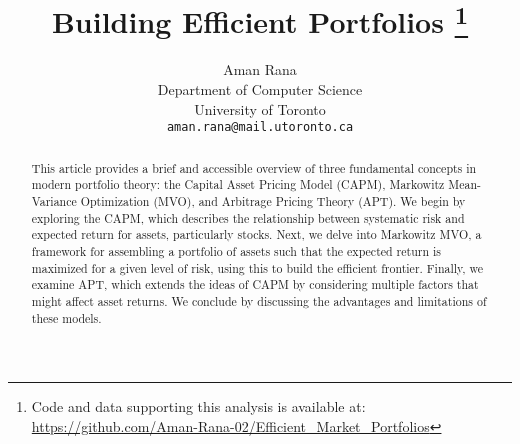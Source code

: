 \documentclass[11pt,a4paper,english]{article}
\date{\displaydate{date}}
\title{Building Efficient Portfolios
\thanks{Code and data supporting this analysis is available at: \url{https://github.com/Aman-Rana-02/Efficient_Market_Portfolios}}}
\author{%
  Aman Rana\\
  \small Department of Computer Science\\
  \small University of Toronto\\
  \small\texttt{aman.rana@mail.utoronto.ca}
}
\begin{document}
  \maketitle

  \begin{abstract}
    \noindent This article provides a brief and accessible overview of three fundamental concepts in modern portfolio theory: the Capital Asset Pricing Model (CAPM), Markowitz Mean-Variance Optimization (MVO), and Arbitrage Pricing Theory (APT). 
    We begin by exploring the CAPM, which describes the relationship between systematic risk and expected return for assets, particularly stocks. 
    Next, we delve into Markowitz MVO, a framework for assembling a portfolio of assets such that the expected return is maximized for a given level of risk, using this to build the efficient frontier.
     Finally, we examine APT, which extends the ideas of CAPM by considering multiple factors that might affect asset returns.
     We conclude by discussing the advantages and limitations of these models.
  \end{abstract}

  \newpage
  \tableofcontents

  \newpage

  

  
 
  

  

  

  

  \newpage
  
  

\end{document}
